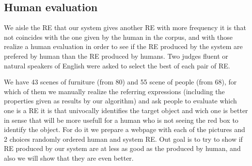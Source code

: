 \subsection{Human evaluation} \label{sec:evaluation}

We aisle the RE that our system gives another RE with more frequency it is that not coincides with the one given by the human in the corpus, and with those realize a human evaluation in order to see if the RE produced by the system are prefered by human than the RE produced by humans. Two judges fluent or natural speakers of English were asked to select the best of each pair of RE.

We have 43 scenes of furniture (from 80) and 55 scene of people (from 68), for which of them we manually realize the referring expressions (including the properties given as results by our algorithm) and ask people to evaluate which one is a RE it is that univocally identifies the target object and wich one is better in sense that will be more usefull for a human who is not seeing the red box to identify the object. For do it we prepare a webpage with each of the pictures and 2 choices randomly ordered human and system RE. Out goal is to try to show if RE produced by our system are at less as good as the produced by human, and also we will show that they are even better.



